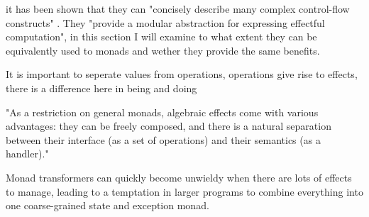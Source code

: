 it has been shown that they can "concisely describe many complex control-flow constructs" \cite{leijen2017type}.
They "provide a modular abstraction for expressing effectful computation"\cite{dolan2015effective},
in this section I will examine to what extent they can be equivalently used to monads and wether
they provide the same benefits.





\cite{Plotkin:2002dw}

It is important to seperate values from operations, operations give rise to effects,
there is a difference here in being and doing

"As a restriction on general monads, algebraic effects come with various advantages:
they can be freely composed, 
and there is a natural separation between their interface (as a set of operations) and their semantics (as a handler)."


Monad transformers can quickly become unwieldy when there are lots of effects to manage, leading to a temptation in larger programs to combine everything into one coarse-grained state and exception monad.

